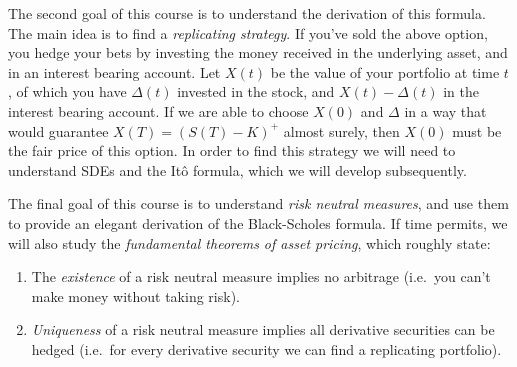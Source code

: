 The second goal of this course is to understand the derivation of this formula.
The main idea is to find a \emph{replicating strategy}.
If you've sold the above option, you hedge your bets by investing the money received in the underlying asset, and in an interest bearing account.
Let $X(t)$ be the value of your portfolio at time $t$, of which you have $\Delta(t)$ invested in the stock, and $X(t) - \Delta(t)$ in the interest bearing account.
If we are able to choose $X(0)$ and $\Delta$ in a way that would guarantee $X(T) = (S(T) - K)^+$ almost surely, then $X(0)$ must be the fair price of this option.
In order to find this strategy we will need to understand SDEs and the It\^o formula, which we will develop subsequently.

The final goal of this course is to understand \emph{risk neutral measures}, and use them to provide an elegant derivation of the Black-Scholes formula.
If time permits, we will also study the \emph{fundamental theorems of asset pricing}, which roughly state:
\begin{enumerate}
  \item
    The \emph{existence} of a risk neutral measure implies no arbitrage (i.e.\ you can't make money without taking risk).
  \item
    \emph{Uniqueness} of a risk neutral measure implies all derivative securities can be hedged (i.e.\ for every derivative security we can find a replicating portfolio).
\end{enumerate}

